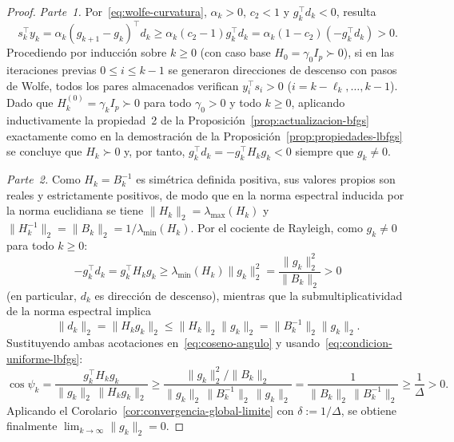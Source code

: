 \documentclass[a4paper,openany,oneside,10pt]{report}
\theoremstyle{pnlTeorema}
\theoremstyle{pnlDefinicion}
\theoremstyle{pnlObservacion}
\begin{document}
\begin{proof}
\emph{Parte~1.} Por~\eqref{eq:wolfe-curvatura}, $\alpha_k>0$, $c_2<1$ y
$g_k^\top d_k<0$, resulta
\[
s_k^\top y_k = \alpha_k (g_{k+1}-g_k)^\top d_k
\ge \alpha_k (c_2-1) g_k^\top d_k
= \alpha_k (1-c_2)(-g_k^\top d_k) > 0.
\]
Procediendo por inducción sobre $k\ge 0$ (con caso base $H_0=\gamma_0 I_p\succ 0$), si en las iteraciones previas $0\le i\le k-1$ se generaron direcciones de descenso con pasos
de Wolfe, todos los pares almacenados verifican $y_i^\top s_i>0$ ($i=k-\ell_k,\ldots,k-1$).
Dado que $H_k^{(0)}=\gamma_k I_p\succ 0$ para todo $\gamma_0>0$ y todo $k\ge 0$,
aplicando inductivamente la propiedad~2 de la Proposición~\ref{prop:actualizacion-bfgs}
exactamente como en la demostración de la Proposición~\ref{prop:propiedades-lbfgs}
se concluye que $H_k\succ 0$ y, por tanto, $g_k^\top d_k=-g_k^\top H_k g_k<0$ siempre que
$g_k\neq 0$.

\emph{Parte~2.} Como $H_k=B_k^{-1}$ es simétrica definida positiva, sus valores
propios son reales y estrictamente positivos, de modo que en la norma espectral
inducida por la norma euclidiana se tiene $\|H_k\|_2=\lambda_{\max}(H_k)$ y
$\|H_k^{-1}\|_2=\|B_k\|_2=1/\lambda_{\min}(H_k)$. Por el cociente de Rayleigh,
como $g_k\neq 0$ para todo $k\ge 0$:
\[
-g_k^\top d_k = g_k^\top H_k g_k \ge \lambda_{\min}(H_k)\|g_k\|_2^2
= \frac{\|g_k\|_2^2}{\|B_k\|_2} > 0
\]
(en particular, $d_k$ es dirección de descenso), mientras que la submultiplicatividad de la norma espectral implica
\[
\|d_k\|_2 = \|H_k g_k\|_2 \le \|H_k\|_2\|g_k\|_2 = \|B_k^{-1}\|_2\|g_k\|_2.
\]
Sustituyendo ambas acotaciones en~\eqref{eq:coseno-angulo} y usando~\eqref{eq:condicion-uniforme-lbfgs}:
\[
\cos\psi_k
= \frac{g_k^\top H_k g_k}{\|g_k\|_2\,\|H_k g_k\|_2}
\ge \frac{\|g_k\|_2^2 / \|B_k\|_2}{\|g_k\|_2\,\|B_k^{-1}\|_2\,\|g_k\|_2}
= \frac{1}{\|B_k\|_2\,\|B_k^{-1}\|_2}
\ge \frac{1}{\Delta} > 0.
\]
Aplicando el Corolario~\ref{cor:convergencia-global-limite} con $\delta:=1/\Delta$,
se obtiene finalmente $\lim_{k\to\infty}\|g_k\|_2=0$.
\end{proof}
\end{document}

